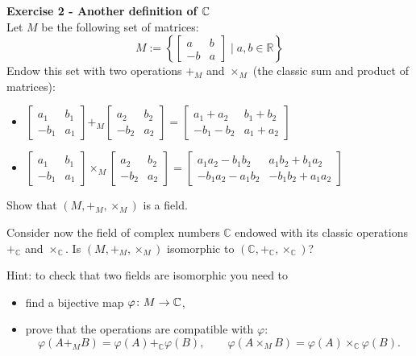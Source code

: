 \documentclass[12pt,a4paper]{article}
\begin{document}
\textbf{Exercise 2 - Another definition of $\mathbb{C}$}\\
Let $M$ be the following set of matrices:
$$M:=\left\{\begin{bmatrix}a&b\\-b&a\end{bmatrix}\;\Big|\; a,b\in\mathbb{R}\right\}$$
Endow this set with two operations $+_M$ and $\times_M$ (the classic sum and product of matrices):
\begin{itemize}
\item $\begin{bmatrix}a_1&b_1\\-b_1&a_1\end{bmatrix}+_M\begin{bmatrix}a_2&b_2\\-b_2&a_2\end{bmatrix} = \begin{bmatrix}a_1+a_2&b_1+b_2\\-b_1-b_2&a_1+a_2\end{bmatrix}$

\item $\begin{bmatrix}a_1&b_1\\-b_1&a_1\end{bmatrix}\times_M\begin{bmatrix}a_2&b_2\\-b_2&a_2\end{bmatrix} = \begin{bmatrix}a_1 a_2-b_1 b_2&a_1 b_2 + b_1 a_2\\-b_1a_2-a_1b_2&-b_1 b_2+a_1 a_2\end{bmatrix}$
\end{itemize}

Show that $(M, +_M, \times_M)$ is a field.
\bigskip

Consider now the field of complex numbers $\mathbb{C}$ endowed with its classic operations $+_\mathbb{C}$ and $\times_\mathbb{C}$. Is $(M, +_M, \times_M)$ isomorphic to $(\mathbb C,+_\mathbb{C},\times_\mathbb{C})$?
\bigskip

Hint: to check that two fields are isomorphic you need to
\begin{itemize}
\item find a bijective map $\varphi\colon M\rightarrow\mathbb{C}$,
\item prove that the operations are compatible with $\varphi$:
$$\varphi(A+_M B)=\varphi(A)+_\mathbb{C} \varphi(B),\qquad \varphi(A\times_M B)=\varphi(A)\times_\mathbb{C} \varphi(B).$$
\end{itemize}
\end{document}

